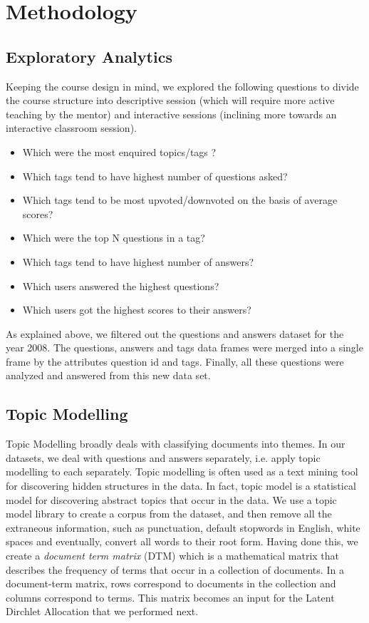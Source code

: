 \documentclass[journal]{IEEEtran}
\begin{document}
\section{Methodology}
\subsection{Exploratory Analytics}
Keeping the course design in mind, we explored the following questions to divide the course structure into descriptive session (which will require more active teaching by the mentor) and interactive sessions (inclining more towards an interactive classroom session).
\begin{itemize}
    \item Which were the most enquired topics/tags ?
    \item Which tags tend to have highest number of questions asked?
    \item Which tags tend to be most upvoted/downvoted on the basis of average scores?
    \item Which were the top N questions in a tag?
    \item Which tags tend to have highest number of answers?
    \item Which users answered the highest questions?
    \item Which users got the highest scores to their answers?
\end{itemize}
As explained above, we filtered out the questions and answers dataset for the year 2008. The questions, answers and tags data frames were merged into a single frame by the attributes question id and tags. Finally, all these questions were analyzed and answered from this new data set.

\subsection{Topic Modelling}
Topic Modelling broadly deals with classifying documents into themes. In our datasets, we deal with questions and answers separately, i.e. apply topic modelling to each separately. Topic modelling is often used as a text mining tool for discovering hidden structures in the data. In fact, topic model is a statistical model for discovering abstract topics that occur in the data. We use a topic model library to create a corpus from the dataset, and then remove all the extraneous information, such as punctuation, default stopwords in English, white spaces and eventually, convert all words to their root form. Having done this, we create a \textit{document term matrix} (DTM) which is a mathematical matrix that describes the frequency of terms that occur in a collection of documents. In a document-term matrix, rows correspond to documents in the collection and columns correspond to terms. This matrix becomes an input for the Latent Dirchlet Allocation that we performed next.
\vspace{0.5cm}
\end{document}
